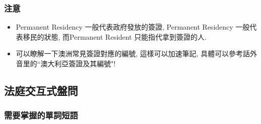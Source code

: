 \subsubsection*{注意}
\begin{itemize}
  \itemsep0em
  \item Permanent Residency 一般代表政府發放的簽證, Permanent Residency 一般代表移民的狀態, 而Permanent Resident 只能指代拿到簽證的人.
  \item 可以瞭解一下澳洲常見簽證對應的編號, 這樣可以加速筆記, 具體可以參考話外音里的``澳大利亞簽證及其編號"!
\end{itemize}

\subsection{法庭交互式盤問}
\subsubsection*{需要掌握的單詞短語}
